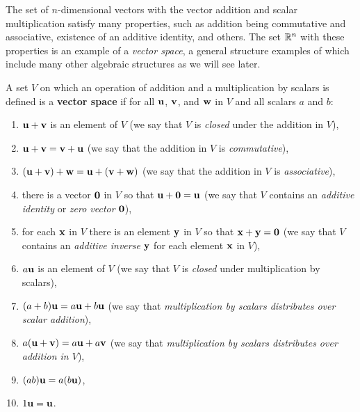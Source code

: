 


The set of $n$-dimensional vectors with the vector addition and scalar multiplication satisfy many properties, such as addition being commutative and associative, existence of an additive identity, and others. The set $\mathbb{R}^n$ with these properties is an example of a \emph{vector space}, a general structure examples of which include many other algebraic structures as we will see later.

\begin{definition} \label{def:3_a_1} A set $V$ on which an operation of addition and a multiplication by scalars is defined is a \textbf{vector space} if for all $\mathbf{u}$, $\mathbf{v}$, and $\mathbf{w}$ in $V$ and all scalars $a$ and $b$:
\begin{enumerate}
\item $\mathbf{u} + \mathbf{v}$ is an element of $V$ (we say that $V$ is \emph{closed} under the addition in $V$),
\item $\mathbf{u} + \mathbf{v} = \mathbf{v} + \mathbf{u}$ (we say that the addition in $V$ is \emph{commutative}),
\item $(\mathbf{u} + \mathbf{v}) + \mathbf{w} = \mathbf{u} + (\mathbf{v} + \mathbf{w})$ (we say that the addition in $V$ is \emph{associative}),
\item there is a vector $\mathbf{0}$ in $V$ so that $\mathbf{u} + \mathbf{0} = \mathbf{u}$ (we say that $V$ contains an \emph{additive identity} or \emph{zero vector} $\mathbf{0}$),
\item for each $\mathbf{x}$ in $V$ there is an element $\mathbf{y}$ in $V$ so that $\mathbf{x} + \mathbf{y} = \mathbf{0}$ (we say that $V$ contains an \emph{additive inverse} $\mathbf{y}$ for each element $\mathbf{x}$ in $V$),
\item $a \mathbf{u}$ is an element of $V$ (we say that $V$ is \emph{closed} under multiplication by scalars),
\item $(a+b) \mathbf{u} = a\mathbf{u} + b\mathbf{u}$ (we say that \emph{multiplication by scalars distributes over scalar addition}),
\item $a(\mathbf{u} + \mathbf{v}) = a\mathbf{u} + a\mathbf{v}$ (we say that \emph{multiplication by scalars distributes over addition in $V$}),
\item $(ab) \mathbf{u} = a(b\mathbf{u})$,
\item $1 \mathbf{u} = \mathbf{u}$.
\end{enumerate}
\end{definition}

